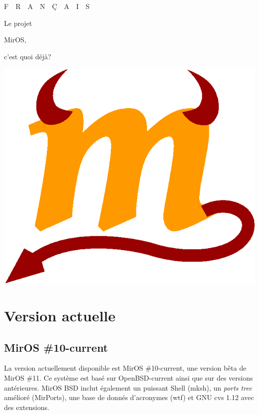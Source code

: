 \documentclass[a4paper,landscape,11pt,notumble]{leaflet}
\begin{document}

\graybox
\begin{center}
{\noindent{}%
\quad F~~R~~A~~N~~\c C~~A~~I~~S\par}
\vfill

\fontsize{48}{48}\selectfont Le projet\par
\fontsize{64}{64}\selectfont MirOS,\par
\fontsize{48}{48}\selectfont c'est quoi déjà?\par

\vfill

\includegraphics[width=0.75\columnwidth]{img/m-color}

\vfill%
\end{center}%
\graybox

\newpage

\section{Version actuelle}

\subsection{MirOS \#10-current}

La version actuellement disponible est MirOS \#10-current, une version bêta de MirOS \#11. Ce système est basé sur OpenBSD-current ainsi que sur des versions antérieures. MirOS BSD inclut également un puissant Shell (mksh), un \emph{ports tree} amélioré (MirPorts), une base de donnés d’acronymes (wtf) et GNU cvs 1.12 avec des extensions. 
\end{document}
